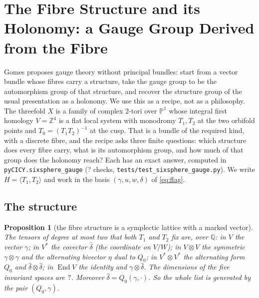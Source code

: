 \documentclass[11pt,a4paper]{article}
\newcommand{\SSGaChecks}{?}\newcommand{\SSGaIndex}{?}\newcommand{\SSGaChiOne}{?}
\newcommand{\ZZ}{\mathbb{Z}}
\newcommand{\QQ}{\mathbb{Q}}
\theoremstyle{plain}
\newtheorem{proposition}{Proposition}
\theoremstyle{definition}
\begin{document}


\section{The Fibre Structure and its Holonomy: a Gauge Group Derived from the Fibre}
\label{sec:gauge}

Gomes \cite{Gomes} proposes gauge theory without principal bundles: start from a vector
bundle whose fibres carry a structure, take the gauge group to be the automorphism group of
that structure, and recover the structure group of the usual presentation as a holonomy. We
use this as a recipe, not as a philosophy. The threefold $X$ is a family of complex
$2$-tori over $\mathbb P^1$ whose integral first homology $V=\ZZ^4$ is a flat local system
with monodromy $T_1,T_2$ at the two orbifold points and $T_0=(T_1T_2)^{-1}$ at the cusp.
That is a bundle of the required kind, with a discrete fibre, and the recipe asks three
finite questions: which structure does every fibre carry, what is its automorphism group,
and how much of that group does the holonomy reach? Each has an exact answer, computed in
\texttt{pyCICY.sixsphere\_gauge} (\SSGaChecks{} checks, \texttt{tests/test\_sixsphere\_gauge.py}).
We write $H=\langle T_1,T_2\rangle$ and work in the basis $(\gamma,u,w,\delta)$ of
\cref{eq:flag}.

\subsection{The structure}

\begin{proposition}[the fibre structure is a symplectic lattice with a marked vector]
\label{prop:gauge-structure}
The tensors of degree at most two that both $T_1$ and $T_2$ fix are, over $\QQ$: in $V$ the
vector $\gamma$; in $V^*$ the covector $\hat\delta$ (the coordinate on $V/W$); in $V\otimes V$
the symmetric $\gamma\otimes\gamma$ and the alternating bivector $\eta$ dual to $Q_0$; in
$V^*\otimes V^*$ the alternating form $Q_0$ and $\hat\delta\otimes\hat\delta$; in
$\operatorname{End}V$ the identity and $\gamma\otimes\hat\delta$. The dimensions of the five
invariant spaces are $?$. Moreover $\hat\delta=Q_0(\gamma,\cdot)$.
So the whole list is generated by the pair $(Q_0,\gamma)$.
\end{proposition}
\end{document}
